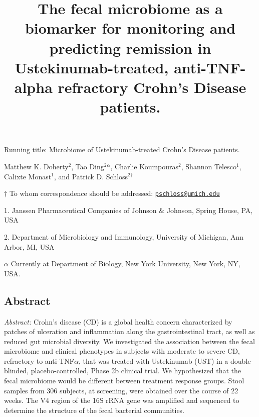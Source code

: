 \documentclass[11pt,]{article}
\title{The fecal microbiome as a biomarker for monitoring and predicting
remission in Ustekinumab-treated, anti-TNF-alpha refractory Crohn's
Disease patients.}
\author{}
\date{}
\begin{document}
\maketitle

\vspace{35mm}

Running title: Microbiome of Ustekinumab-treated Crohn's Disease
patients.

\vspace{35mm} Matthew K. Doherty\({^2}\), Tao Ding\({^2}\)\({^\alpha}\),
Charlie Koumpouras\({^2}\), Shannon Telesco\({^1}\), Calixte
Monast\({^1}\), and Patrick D. Schloss\({^2}\)\({^\dagger}\)

\(\dagger\) To whom correspondence should be addressed:
\href{mailto:pschloss@umich.edu}{\nolinkurl{pschloss@umich.edu}}

1. Janssen Pharmaceutical Companies of Johnson \({\&}\) Johnson, Spring
House, PA, USA

2. Department of Microbiology and Immunology, University of Michigan,
Ann Arbor, MI, USA

\({\alpha}\) Currently at Department of Biology, New York University,
New York, NY, USA.

\newpage

\subsection{Abstract}\label{abstract}

\emph{Abstract:} Crohn's disease (CD) is a global health concern
characterized by patches of ulceration and inflammation along the
gastrointestinal tract, as well as reduced gut microbial diversity. We
investigated the association between the fecal microbiome and clinical
phenotypes in subjects with moderate to severe CD, refractory to
anti-TNF\({\alpha}\), that was treated with Ustekinumab (UST) in a
double-blinded, placebo-controlled, Phase 2b clinical trial. We
hypothesized that the fecal microbiome would be different between
treatment response groups. Stool samples from 306 subjects, at
screening, were obtained over the course of 22 weeks. The V4 region of
the 16S rRNA gene was amplified and sequenced to determine the structure
of the fecal bacterial communities.
\end{document}
